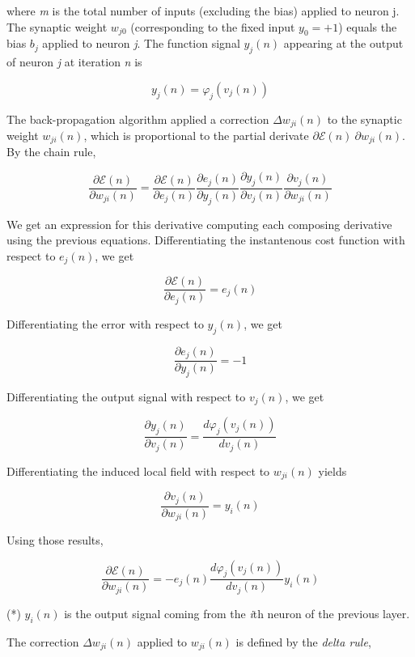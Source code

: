 \documentclass[twocolumn]{article}
\begin{document}
	\noindent where \textit{m} is the total number of inputs (excluding the bias) applied to neuron j. The synaptic weight $ w_{j0} $ (corresponding to the fixed input $ y_{0} = +1 $) equals the bias $ b_{j} $ applied to neuron \textit{j}. The function signal $ y_{j} (n) $ appearing at the output of neuron \textit{j} at iteration \textit{n} is

	$$ y_{j} (n) = \varphi_{j} (v_{j} (n)) $$

	The back-propagation algorithm applied a correction $ \Delta w_{ji} (n) $ to the synaptic weight $ w_{ji} (n) $, which is proportional to the partial derivate $ \partial \mathcal{E} (n) \ \partial w_{ji} (n) $. By the chain rule,

	$$ \dfrac{\partial \mathcal{E} (n)}{\partial w_{ji} (n)} = \dfrac{\partial \mathcal{E} (n) }{ \partial e_{j} (n)} \dfrac{\partial e_{j} (n)}{\partial y_{j} (n)} \dfrac{\partial y_{j} (n)}{\partial v_{j} (n)} \dfrac{\partial v_{j} (n)}{\partial w_{ji} (n)} $$

	We get an expression for this derivative computing each composing derivative using the previous equations. Differentiating the instantenous cost function with respect to $ e_{j} (n) $, we get

	$$ \dfrac{\partial \mathcal{E} (n)}{\partial e_{j} (n)} = e_{j} (n) $$

	Differentiating the error with respect to $ y_{j} (n) $, we get

	$$ \dfrac{\partial e_{j} (n)}{\partial y_{j} (n)} = -1 $$

	Differentiating the output signal with respect to $ v_{j} (n) $, we get

	$$ \dfrac{\partial y_{j} (n)}{\partial v_{j} (n)} = \dfrac{d \varphi_{j} (v_{j} (n))}{d v_{j} (n)} $$

	Differentiating the induced local field with respect to $ w_{ji} (n)$ yields

	$$ \dfrac{\partial v_{j} (n)}{\partial w_{ji} (n)} = y_{i} (n) $$

	Using those results,

	$$ \dfrac{\partial \mathcal{E} (n)}{\partial w_{ji} (n)} = -e_{j} (n) \dfrac{d \varphi_{j} (v_{j} (n))}{d v_{j} (n)} y_{i} (n) $$

	\noindent (*) $ y_{i} (n) $ is the output signal coming from the \textit{i}th neuron of the previous layer.

	The correction $ \Delta w_{ji} (n) $ applied to $ w_{ji} (n) $ is defined by the \textit{delta rule},
\end{document}
